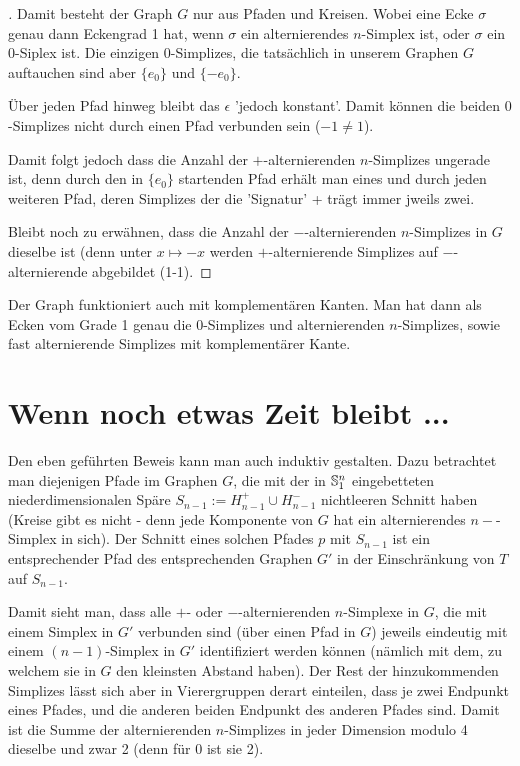 \documentclass[10pt,a4paper]{article}
\begin{document}
\begin{proof}[]
Damit besteht der Graph $G$ nur aus Pfaden und Kreisen. Wobei eine Ecke $\sigma$ genau dann Eckengrad 1 hat, wenn $\sigma$ ein alternierendes $n$-Simplex ist, oder $\sigma$ ein $0$-Siplex ist. Die einzigen $0$-Simplizes, die tatsächlich in unserem Graphen $G$ auftauchen sind aber $\{e_0\}$ und $\{-e_0\}$.

Über jeden Pfad hinweg bleibt das $\epsilon$ 'jedoch konstant'. Damit können die beiden $0$-Simplizes nicht durch einen Pfad verbunden sein ($-1\neq 1$).

Damit folgt jedoch dass die Anzahl der $+$-alternierenden $n$-Simplizes ungerade ist, denn durch den in $\{e_0\}$ startenden Pfad erhält man eines und durch jeden weiteren Pfad, deren Simplizes der die 'Signatur' + trägt immer jweils zwei.

Bleibt noch zu erwähnen, dass die Anzahl der $-$-alternierenden $n$-Simplizes in $G$ dieselbe ist (denn unter $x\mapsto-x$ werden $+$-alternierende Simplizes auf $-$-alternierende abgebildet (1-1).
\end{proof}

\begin{remark}
Der Graph funktioniert auch mit komplementären Kanten. Man hat dann als Ecken vom Grade 1 genau die $0$-Simplizes und alternierenden $n$-Simplizes, sowie fast alternierende Simplizes mit komplementärer Kante.
\end{remark}

\section{Wenn noch etwas Zeit bleibt ... }

Den eben geführten Beweis kann man auch induktiv gestalten. Dazu betrachtet man diejenigen Pfade im Graphen $G$, die mit der in $\mathbb{S}^n_1$ eingebetteten niederdimensionalen Späre $S_{n-1}:=H^+_{n-1}\cup H^-_{n-1}$ nichtleeren Schnitt haben (Kreise gibt es nicht - denn jede Komponente von $G$ hat ein alternierendes $n-$-Simplex in sich). Der Schnitt eines solchen Pfades $p$ mit $S_{n-1}$ ist ein entsprechender Pfad des entsprechenden Graphen $G'$ in der Einschränkung von $T$ auf $S_{n-1}$.

Damit sieht man, dass alle $+$- oder $-$-alternierenden $n$-Simplexe in $G$, die mit einem Simplex in $G'$ verbunden sind (über einen Pfad in $G$) jeweils eindeutig mit einem $(n-1)$-Simplex in $G'$ identifiziert werden können (nämlich mit dem, zu welchem sie in $G$ den kleinsten Abstand haben). Der Rest der hinzukommenden Simplizes lässt sich aber in Vierergruppen derart einteilen, dass je zwei Endpunkt eines Pfades, und die anderen beiden Endpunkt des anderen Pfades sind. Damit ist die Summe der alternierenden $n$-Simplizes in jeder Dimension modulo 4 dieselbe und zwar 2 (denn für 0 ist sie 2).
\end{document}
